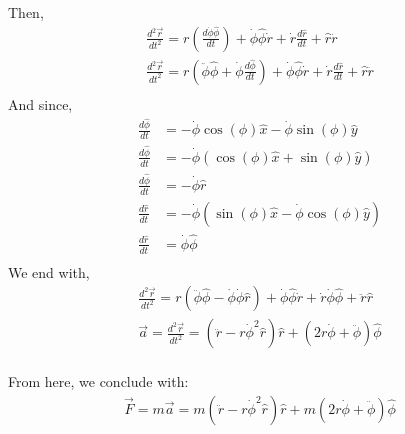 \documentclass{article}
\begin{document}
Then,
\begin{equation}
    \begin{aligned}
        \frac{d^2\vec{r}}{dt^2} = r(\frac{d\dot{\phi}\hat{\phi}}{dt}) + \dot{\phi}\hat{\phi}\dot{r} + \dot{r}\frac{d\hat{r}}{dt} + \hat{r}\ddot{r}                         \\
        \frac{d^2\vec{r}}{dt^2} = r(\ddot{\phi}\hat{\phi} + \dot{\phi}\frac{d\hat{\phi}}{dt}) + \dot{\phi}\hat{\phi}\dot{r} + \dot{r}\frac{d\hat{r}}{dt} + \hat{r}\ddot{r} \\
    \end{aligned}
\end{equation}
And since,
\begin{equation}
    \begin{aligned}
        \frac{d\hat{\phi}}{dt} & = -\dot{\phi}\cos(\phi)\hat{x} - \dot{\phi}\sin(\phi)\hat{y}   \\
        \frac{d\hat{\phi}}{dt} & = -\dot{\phi}(\cos(\phi)\hat{x} + \sin(\phi)\hat{y})           \\
        \frac{d\hat{\phi}}{dt} & = -\dot{\phi}\hat{r}                                           \\
        \frac{d\hat{r}}{dt}    & = -\dot{\phi}(\sin(\phi)\hat{x} - \dot{\phi}\cos(\phi)\hat{y}) \\
        \frac{d\hat{r}}{dt}    & = \dot{\phi}\hat{\phi}                                         \\
    \end{aligned}
\end{equation}
We end with,
\begin{equation}
    \begin{aligned}
        \frac{d^2\vec{r}}{dt^2} = r(\ddot{\phi}\hat{\phi} - \dot{\phi}\dot{\phi}\hat{r}) + \dot{\phi}\hat{\phi}\dot{r} + \dot{r}\dot{\phi}\hat{\phi} + \ddot{r}\hat{r} \\
        \vec{a} = \frac{d^2\vec{r}}{dt^2} = (\ddot{r} - r\dot{\phi}^2\hat{r})\hat{r} + (2r\dot{\phi} + \ddot{\phi})\hat{\phi}                                          \\
    \end{aligned}
\end{equation}

From here, we conclude with:
\begin{equation}
    \begin{aligned}
        \boxed{\vec{F} = m\vec{a} = m(\ddot{r} - r\dot{\phi}^2\hat{r})\hat{r} + m(2r\dot{\phi} + \ddot{\phi})\hat{\phi}} \\
    \end{aligned}
\end{equation}
\end{document}
